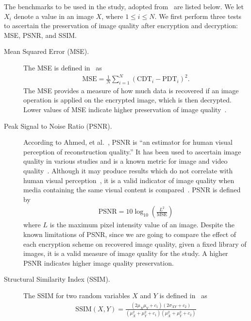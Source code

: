 The benchmarks to be used in the study, adopted from~\cite{ahmed_benchmark_2016, ahmad_efficiency_2012, wu_npcr_2011} are listed below. We let $X_i$ denote a value in an image $X$, where $1 \leq i \leq N$.
We first perform three tests to ascertain the preservation of image quality after encryption and decryption: MSE, PSNR, and SSIM.
\begin{description}
	\item [Mean Squared Error (MSE).] The MSE is defined in~\cite{ahmed_benchmark_2016} as
	\begin{align}
        \mathrm{MSE} = \frac{1}{N}\sum_{i=1}^{N}{(\mathrm{CDT}_i - \mathrm{PDT}_i)^2}.
	\end{align}
	The MSE provides a measure of how much data is recovered if an image operation is applied on the encrypted image, which is then decrypted. Lower values of MSE indicate higher preservation of image quality~\cite{ahmed_benchmark_2016, ahmad_efficiency_2012}.
	\item [Peak Signal to Noise Ratio (PSNR).]
	According to Ahmed, et al.~\cite{ahmed_benchmark_2016}, PSNR is ``an estimator for human visual perception of reconstruction quality.'' It has been used to ascertain image quality in various studies and is a known metric for image and video quality~\cite{upmanyu_efficient_2009, jain_image_2016, akramullah_video_2014}. Although it may produce results which do not correlate with human visual perception~\cite{huynh-thu_accuracy_2012, ahmed_benchmark_2016}, it is a valid indicator of image quality when media containing the same visual content is compared~\cite{huynh-thu_accuracy_2012}.
	PSNR is defined by
	\begin{align}
        \mathrm{PSNR} = 10\log_{10}{\left( \frac{L^2}{\mathrm{MSE}} \right)}
	\end{align}
	where $L$ is the maximum pixel intensity value of an image.
	Despite the known limitations of PSNR, since we are going to compare the effect of each encryption scheme on recovered image quality, given a fixed library of images, it is a valid measure of image quality for the study. A higher PSNR indicates higher image quality preservation.
	\item [Structural Similarity Index (SSIM).]
	The SSIM for two random variables $X$ and $Y$ is defined in~\cite{ahmed_benchmark_2016, akramullah_video_2014} as
	\begin{align}
        \mathrm{SSIM}(X,Y) = \frac{(2\mu_X\mu_Y+c_1)(2\sigma_{XY}+c_2)}{(\mu_X^2+\mu_Y^2+c_1)(\mu_X^2+\mu_Y^2+c_2)}
	\end{align}

\end{description}
